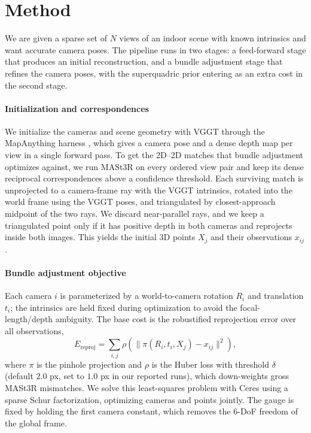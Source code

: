 \section{Method}
We are given a sparse set of $N$ views of an indoor scene with known intrinsics and want accurate camera poses. The pipeline runs in two stages: a feed-forward stage that produces an initial reconstruction, and a bundle adjustment stage that refines the camera poses, with the superquadric prior entering as an extra cost in the second stage.

\paragraph{Initialization and correspondences}
We initialize the cameras and scene geometry with VGGT \cite{wang2025vggtvisualgeometrygrounded} through the MapAnything harness \cite{keetha2026mapanythinguniversalfeedforwardmetric}, which gives a camera pose and a dense depth map per view in a single forward pass. To get the 2D--2D matches that bundle adjustment optimizes against, we run MASt3R \cite{leroy2024groundingimagematching3d} on every ordered view pair and keep its dense reciprocal correspondences above a confidence threshold. Each surviving match is unprojected to a camera-frame ray with the VGGT intrinsics, rotated into the world frame using the VGGT poses, and triangulated by closest-approach midpoint of the two rays. We discard near-parallel rays, and we keep a triangulated point only if it has positive depth in both cameras and reprojects inside both images. This yields the initial 3D points $X_j$ and their observations $x_{ij}$.

\paragraph{Bundle adjustment objective}
Each camera $i$ is parameterized by a world-to-camera rotation $R_i$ and translation $t_i$; the intrinsics are held fixed during optimization to avoid the focal-length/depth ambiguity. The base cost is the robustified reprojection error over all observations,
\begin{equation}
E_{\text{reproj}} = \sum_{i,j} \rho\!\left( \lVert \pi(R_i, t_i, X_j) - x_{ij} \rVert^2 \right),
\end{equation}
where $\pi$ is the pinhole projection and $\rho$ is the Huber loss with threshold $\delta$ (default $2.0$ px, set to $1.0$ px in our reported runs), which down-weights gross MASt3R mismatches. We solve this least-squares problem with Ceres using a sparse Schur factorization, optimizing cameras and points jointly. The gauge is fixed by holding the first camera constant, which removes the $6$-DoF freedom of the global frame.

